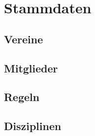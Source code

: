 \chapter{Stammdaten}

\section{Vereine}

\section{Mitglieder}

\section{Regeln}

\section{Disziplinen}